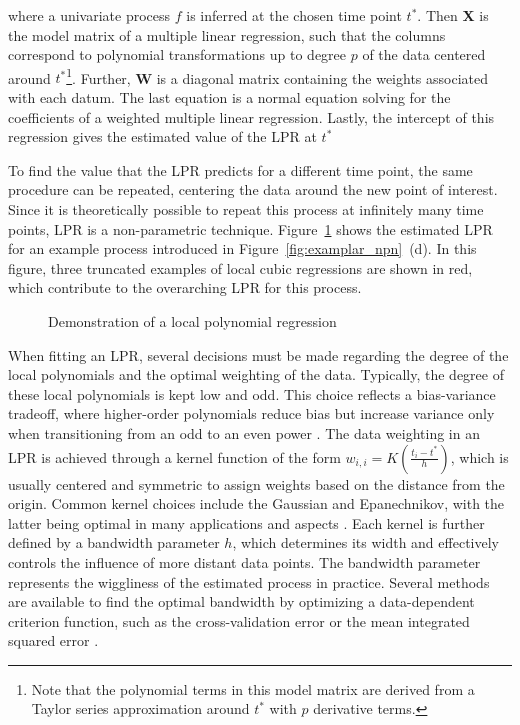 \documentclass[man, floatsintext]{apa7}
\begin{document}
\noindent where a univariate process $f$ is inferred at the
chosen time point $t^*$. Then \textbf{X} is the model matrix of a multiple
linear regression, such that the columns correspond to polynomial
transformations up to degree $p$ of the data centered around
$t^*$\footnote{Note
  that the polynomial terms in this model matrix are derived from a Taylor
  series approximation around $t^*$ with $p$ derivative terms.}. Further,
\textbf{W} is a diagonal matrix containing the weights associated with each
datum. The last equation is a normal equation solving for the coefficients of a
weighted multiple linear regression. Lastly, the intercept of this regression
gives the estimated value of the LPR at $t^*$

To find the value that the LPR predicts for a different time point, the same
procedure can be repeated, centering the data around the new point of interest.
Since it is theoretically possible to repeat this process at infinitely many
time points, LPR is a non-parametric technique. Figure~\ref{fig:locpol_dem}
shows the estimated LPR for an example process introduced in
Figure~\ref{fig:examplar_npn}~(d). In this figure, three truncated examples of
local cubic regressions are shown in red, which contribute to the overarching
LPR for this process.\@

\begin{figure}[!t]
  \caption{Demonstration of a local polynomial regression}
  \label{fig:locpol_dem}
\end{figure}

When fitting an LPR, several decisions must be made regarding the degree of the
local polynomials and the optimal weighting of the data. Typically, the degree
of these local polynomials is kept low and odd. This choice reflects a
bias-variance tradeoff, where higher-order polynomials reduce bias but increase
variance only when transitioning from an odd to an even power
\parencite{ruppert_multivariate_1994}. The data weighting in an LPR is achieved
through a kernel function of the form $w_{i, i} = K(\frac{t_i - t^*}{h})$,
which is usually centered and symmetric to assign weights based on the distance
from the origin. Common kernel choices include the Gaussian and Epanechnikov,
with the latter being optimal in many applications and aspects
\parencite{fan_local_1997}. Each kernel is further defined by a bandwidth
parameter $h$, which determines its width and effectively controls the
influence of more distant data points. The bandwidth parameter represents the
wiggliness of the estimated process in practice. Several methods are available
to find the optimal bandwidth by optimizing a data-dependent criterion
function, such as the cross-validation error or the mean integrated squared
error \parencite{kohler_review_2014, debruyne_model_2008}.
\end{document}

